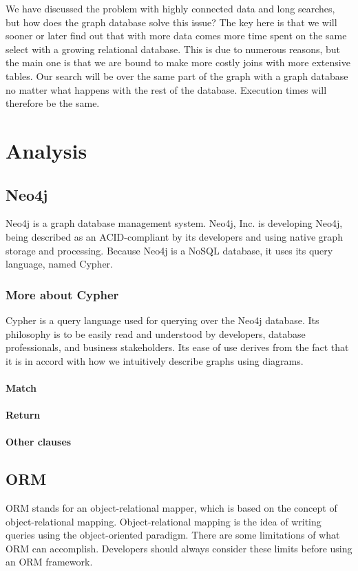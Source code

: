 \documentclass[thesis=M,english]{FITthesis}[2019/12/23]
\begin{document}
We have discussed the problem with highly connected data and long searches, but how does the graph database solve this issue? The key here is that we will sooner or later find out that with more data comes more time spent on the same select with a growing relational database. This is due to numerous reasons, but the main one is that we are bound to make more costly joins with more extensive tables. Our search will be over the same part of the graph with a graph database no matter what happens with the rest of the database. Execution times will therefore be the same.

\chapter {Analysis}

\section{Neo4j}

Neo4j is a graph database management system. Neo4j, Inc. is developing Neo4j, being described as an ACID-compliant by its developers and using native graph storage and processing. Because Neo4j is a NoSQL database, it uses its query language, named Cypher.

\subsection{More about Cypher}

Cypher is a query language used for querying over the Neo4j database. Its philosophy is to be easily read and understood by developers, database professionals, and business stakeholders. Its ease of use derives from the fact that it is in accord with how we intuitively describe graphs using diagrams. \cite{robinson_graph_2015}

\subsubsection{Match}
\subsubsection{Return}
\subsubsection{Other clauses}

\section{ORM}
ORM stands for an object-relational mapper, which is based on the concept of object-relational mapping. Object-relational mapping is the idea of writing queries using the object-oriented paradigm.
There are some limitations of what ORM can accomplish. Developers should always consider these limits before using an ORM framework. \cite{mario_hoyos_what_2018}
\end{document}
